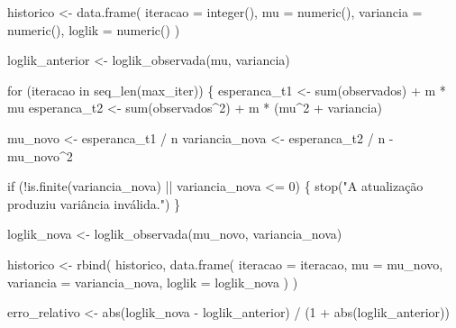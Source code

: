\documentclass[
  letterpaper,
  DIV=11,
  numbers=noendperiod]{scrreprt}
\newenvironment{Shaded}{\begin{snugshade}}{\end{snugshade}}
\newcommand{\AttributeTok}[1]{\textcolor[rgb]{0.40,0.45,0.13}{#1}}
\newcommand{\ControlFlowTok}[1]{\textcolor[rgb]{0.00,0.23,0.31}{#1}}
\newcommand{\DecValTok}[1]{\textcolor[rgb]{0.68,0.00,0.00}{#1}}
\newcommand{\FunctionTok}[1]{\textcolor[rgb]{0.28,0.35,0.67}{#1}}
\newcommand{\NormalTok}[1]{\textcolor[rgb]{0.00,0.23,0.31}{#1}}
\newcommand{\OtherTok}[1]{\textcolor[rgb]{0.00,0.23,0.31}{#1}}
\newcommand{\SpecialCharTok}[1]{\textcolor[rgb]{0.37,0.37,0.37}{#1}}
\newcommand{\StringTok}[1]{\textcolor[rgb]{0.13,0.47,0.30}{#1}}
\begin{document}
\begin{Shaded}
\begin{Highlighting}[]
\NormalTok{  historico }\OtherTok{\textless{}{-}} \FunctionTok{data.frame}\NormalTok{(}
    \AttributeTok{iteracao =} \FunctionTok{integer}\NormalTok{(),}
    \AttributeTok{mu =} \FunctionTok{numeric}\NormalTok{(),}
    \AttributeTok{variancia =} \FunctionTok{numeric}\NormalTok{(),}
    \AttributeTok{loglik =} \FunctionTok{numeric}\NormalTok{()}
\NormalTok{  )}

\NormalTok{  loglik\_anterior }\OtherTok{\textless{}{-}} \FunctionTok{loglik\_observada}\NormalTok{(mu, variancia)}

  \ControlFlowTok{for}\NormalTok{ (iteracao }\ControlFlowTok{in} \FunctionTok{seq\_len}\NormalTok{(max\_iter)) \{}
\NormalTok{    esperanca\_t1 }\OtherTok{\textless{}{-}} \FunctionTok{sum}\NormalTok{(observados) }\SpecialCharTok{+}\NormalTok{ m }\SpecialCharTok{*}\NormalTok{ mu}
\NormalTok{    esperanca\_t2 }\OtherTok{\textless{}{-}} \FunctionTok{sum}\NormalTok{(observados}\SpecialCharTok{\^{}}\DecValTok{2}\NormalTok{) }\SpecialCharTok{+}\NormalTok{ m }\SpecialCharTok{*}\NormalTok{ (mu}\SpecialCharTok{\^{}}\DecValTok{2} \SpecialCharTok{+}\NormalTok{ variancia)}

\NormalTok{    mu\_novo }\OtherTok{\textless{}{-}}\NormalTok{ esperanca\_t1 }\SpecialCharTok{/}\NormalTok{ n}
\NormalTok{    variancia\_nova }\OtherTok{\textless{}{-}}\NormalTok{ esperanca\_t2 }\SpecialCharTok{/}\NormalTok{ n }\SpecialCharTok{{-}}\NormalTok{ mu\_novo}\SpecialCharTok{\^{}}\DecValTok{2}

    \ControlFlowTok{if}\NormalTok{ (}\SpecialCharTok{!}\FunctionTok{is.finite}\NormalTok{(variancia\_nova) }\SpecialCharTok{||}\NormalTok{ variancia\_nova }\SpecialCharTok{\textless{}=} \DecValTok{0}\NormalTok{) \{}
      \FunctionTok{stop}\NormalTok{(}\StringTok{"A atualização produziu variância inválida."}\NormalTok{)}
\NormalTok{    \}}

\NormalTok{    loglik\_nova }\OtherTok{\textless{}{-}} \FunctionTok{loglik\_observada}\NormalTok{(mu\_novo, variancia\_nova)}

\NormalTok{    historico }\OtherTok{\textless{}{-}} \FunctionTok{rbind}\NormalTok{(}
\NormalTok{      historico,}
      \FunctionTok{data.frame}\NormalTok{(}
        \AttributeTok{iteracao =}\NormalTok{ iteracao,}
        \AttributeTok{mu =}\NormalTok{ mu\_novo,}
        \AttributeTok{variancia =}\NormalTok{ variancia\_nova,}
        \AttributeTok{loglik =}\NormalTok{ loglik\_nova}
\NormalTok{      )}
\NormalTok{    )}

\NormalTok{    erro\_relativo }\OtherTok{\textless{}{-}} \FunctionTok{abs}\NormalTok{(loglik\_nova }\SpecialCharTok{{-}}\NormalTok{ loglik\_anterior) }\SpecialCharTok{/}
\NormalTok{      (}\DecValTok{1} \SpecialCharTok{+} \FunctionTok{abs}\NormalTok{(loglik\_anterior))}


\end{Highlighting}
\end{Shaded}
\end{document}
